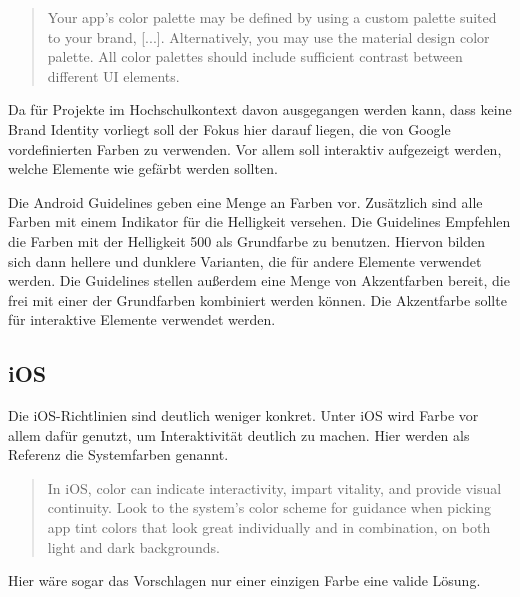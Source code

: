 \begin{quote}
Your app's color palette may be defined by using a custom palette suited to your brand, [...]. Alternatively, you may use the material design color palette. All color palettes should include sufficient contrast between different UI elements.
\end{quote}

Da für Projekte im Hochschulkontext davon ausgegangen werden kann, dass keine Brand Identity vorliegt soll der Fokus hier darauf liegen, die von Google vordefinierten Farben zu verwenden. Vor allem soll interaktiv aufgezeigt werden, welche Elemente wie gefärbt werden sollten.

Die Android Guidelines geben eine Menge an Farben vor. Zusätzlich sind alle Farben mit einem Indikator für die Helligkeit versehen. Die Guidelines Empfehlen die Farben mit der Helligkeit 500 als Grundfarbe zu benutzen. Hiervon bilden sich dann hellere und dunklere Varianten, die für andere Elemente verwendet werden.
Die Guidelines stellen außerdem eine Menge von Akzentfarben bereit, die frei mit einer der Grundfarben kombiniert werden können. Die Akzentfarbe sollte für interaktive Elemente verwendet werden.

\subsection{iOS}

Die iOS-Richtlinien sind deutlich weniger konkret. Unter iOS wird Farbe vor allem dafür genutzt, um Interaktivität deutlich zu machen. Hier werden als Referenz die Systemfarben genannt.

\begin{quote}
In iOS, color can indicate interactivity, impart vitality, and provide visual continuity. Look to the system’s color scheme for guidance when picking app tint colors that look great individually and in combination, on both light and dark backgrounds.
\end{quote}

Hier wäre sogar das Vorschlagen nur einer einzigen Farbe eine valide Lösung.


